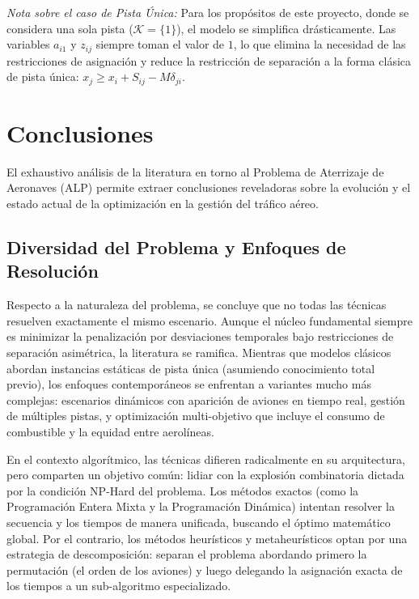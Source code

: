 \documentclass[letter, 10pt]{article}
\begin{document}
\noindent \textit{Nota sobre el caso de Pista \'Unica:} Para los prop\'ositos de este proyecto, donde se considera una sola pista ($\mathcal{K} = \{1\}$), el modelo se simplifica dr\'asticamente. Las variables $a_{i1}$ y $z_{ij}$ siempre toman el valor de $1$, lo que elimina la necesidad de las restricciones de asignaci\'on y reduce la restricci\'on de separaci\'on \cite{beasley2000} a la forma cl\'asica de pista \'unica: $x_j \geq x_i + S_{ij} - M\delta_{ji}$.

\newpage

\section{Conclusiones}

El exhaustivo an\'alisis de la literatura en torno al Problema de Aterrizaje de Aeronaves (ALP) permite extraer conclusiones reveladoras sobre la evoluci\'on y el estado actual de la optimizaci\'on en la gesti\'on del tr\'afico a\'ereo.

\subsection{Diversidad del Problema y Enfoques de Resoluci\'on}
Respecto a la naturaleza del problema, se concluye que no todas las t\'ecnicas resuelven exactamente el mismo escenario. Aunque el n\'ucleo fundamental siempre es minimizar la penalizaci\'on por desviaciones temporales bajo restricciones de separaci\'on asim\'etrica, la literatura se ramifica. Mientras que modelos cl\'asicos abordan instancias est\'aticas de pista \'unica (asumiendo conocimiento total previo), los enfoques contempor\'aneos se enfrentan a variantes mucho m\'as complejas: escenarios din\'amicos con aparici\'on de aviones en tiempo real, gesti\'on de m\'ultiples pistas, y optimizaci\'on multi-objetivo que incluye el consumo de combustible y la equidad entre aerol\'ineas.

En el contexto algor\'itmico, las t\'ecnicas difieren radicalmente en su arquitectura, pero comparten un objetivo com\'un: lidiar con la explosi\'on combinatoria dictada por la condici\'on NP-Hard del problema. Los m\'etodos exactos (como la Programaci\'on Entera Mixta y la Programaci\'on Din\'amica) intentan resolver la secuencia y los tiempos de manera unificada, buscando el \'optimo matem\'atico global. Por el contrario, los m\'etodos heur\'isticos y metaheur\'isticos optan por una estrategia de descomposici\'on: separan el problema abordando primero la permutaci\'on (el orden de los aviones) y luego delegando la asignaci\'on exacta de los tiempos a un sub-algoritmo especializado.
\end{document}
